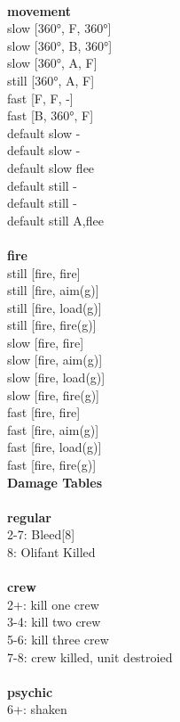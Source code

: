 \ \\ {\bf movement } \\
slow [360°, F, 360°] \\
slow [360°, B, 360°] \\
slow [360°, A, F] \\
still [360°, A, F] \\
fast [F, F, -] \\
fast [B, 360°, F] \\
default slow - \\
default slow - \\
default slow flee \\
default still - \\
default still - \\
default still A,flee \\
\ \\ {\bf fire } \\
still [fire, fire] \\
still [fire, aim(g)] \\
still [fire, load(g)] \\
still [fire, fire(g)] \\
slow [fire, fire] \\
slow [fire, aim(g)] \\
slow [fire, load(g)] \\
slow [fire, fire(g)] \\
fast [fire, fire] \\
fast [fire, aim(g)] \\
fast [fire, load(g)] \\
fast [fire, fire(g)] \\


{\bf Damage Tables} \\
\ \\ {\bf regular } \\
2-7: Bleed[8] \\
8: Olifant Killed \\
\ \\ {\bf crew } \\
2+: kill one crew \\
3-4: kill two crew \\
5-6: kill three crew \\
7-8: crew killed, unit destroied \\
\ \\ {\bf psychic } \\
6+: shaken \\










